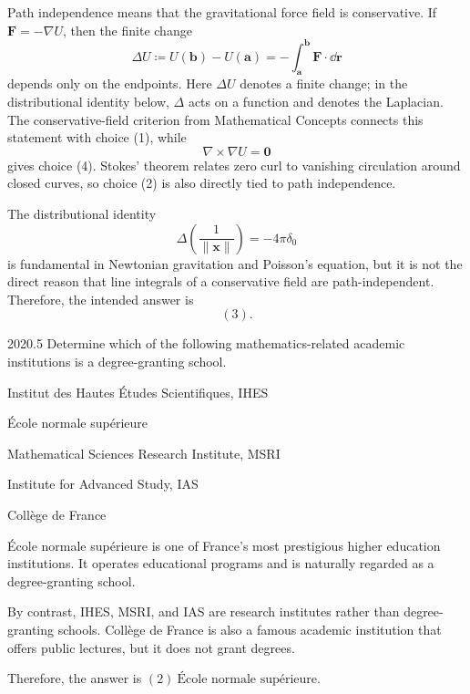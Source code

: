     \begin{solution}
        Path independence means that the gravitational force field is
        conservative. If $\mathbf{F}=-\nabla U$, then the finite change
        \[
            \Delta U
            \coloneqq
            U(\mathbf{b})-U(\mathbf{a})
            =
            -\int_{\mathbf{a}}^{\mathbf{b}}\mathbf{F}\cdot\dd\mathbf{r}
        \]
        depends only on the endpoints. Here $\Delta U$ denotes a finite change;
        in the distributional identity below, $\Delta$ acts on a function and
        denotes the Laplacian. The conservative-field criterion from
        Mathematical Concepts connects this statement with choice (1), while
        \[
            \nabla\times\nabla U=\mathbf{0}
        \]
        gives choice (4). Stokes' theorem relates zero curl to vanishing
        circulation around closed curves, so choice (2) is also directly tied
        to path independence.

        The distributional identity
        \[
            \Delta\left(\frac{1}{\lVert\mathbf{x}\rVert}\right)
            =
            -4\pi\delta_0
        \]
        is fundamental in Newtonian gravitation and Poisson's equation, but it
        is not the direct reason that line integrals of a conservative field are
        path-independent. Therefore, the intended answer is
        \[
            \boxed{(3)}.
        \]
    \end{solution}

    \begin{pastproblem}{2020.5}
        Determine which of the following mathematics-related academic institutions is a
        degree-granting school.
        \begin{problemchoices}
            \item Institut des Hautes Études Scientifiques, IHES
            \item École normale supérieure
            \item Mathematical Sciences Research Institute, MSRI
            \item Institute for Advanced Study, IAS
            \item Collège de France
        \end{problemchoices}
    \end{pastproblem}

    \begin{solution}
        École normale supérieure is one of France's most prestigious higher education
        institutions. It operates educational programs and is naturally regarded as a
        degree-granting school.

        By contrast, IHES, MSRI, and IAS are research institutes rather than degree-granting
        schools. Collège de France is also a famous academic institution that offers public
        lectures, but it does not grant degrees.

        Therefore, the answer is $\boxed{(2)\ \text{École normale supérieure}}$.
    \end{solution}

